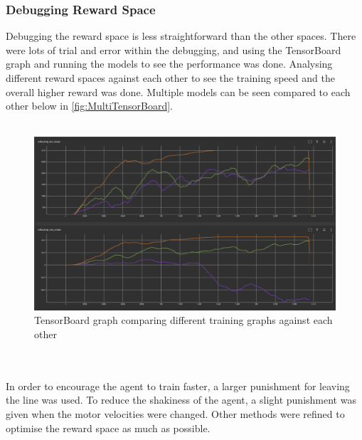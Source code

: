 \documentclass[a4paper,12pt]{article}
\begin{document}
\subsubsection{Debugging Reward Space}

Debugging the reward space is less straightforward than the other spaces. There were lots of trial and error within the debugging, and using the TensorBoard graph and running the models to see the performance was done. Analysing different reward spaces against each other to see the training speed and the overall higher reward was done. Multiple models can be seen compared to each other below in \autoref{fig:MultiTensorBoard}. 
\\\\
\begin{figure}[H]
\centering
\includegraphics[width=15cm]{imgs/MultiTensorBoard.png}
\caption{TensorBoard graph comparing different training graphs against each other}
\label{fig:MultiTensorBoard}

\end{figure}
\\\\
In order to encourage the agent to train faster, a larger punishment for leaving the line was used. To reduce the shakiness of the agent, a slight punishment was given when the motor velocities were changed. Other methods were refined to optimise the reward space as much as possible.
\end{document}
